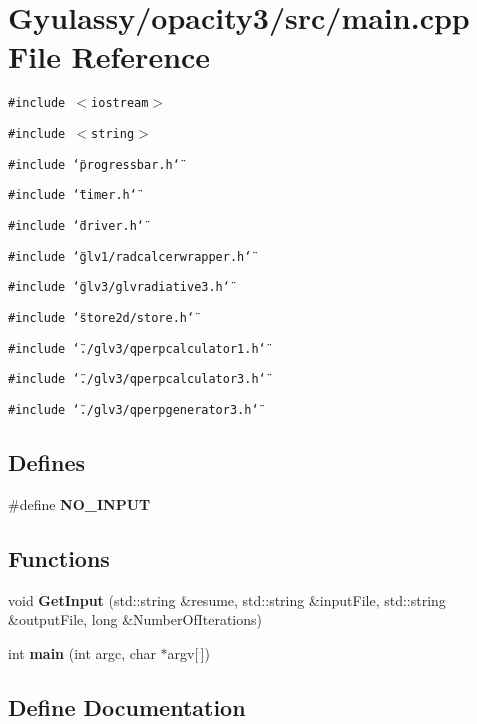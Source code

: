 \section{Gyulassy/opacity3/src/main.cpp File Reference}
\label{main_8cpp}
{\tt \#include $<$iostream$>$}\par
{\tt \#include $<$string$>$}\par
{\tt \#include \char`\"{}progressbar.h\char`\"{}}\par
{\tt \#include \char`\"{}timer.h\char`\"{}}\par
{\tt \#include \char`\"{}driver.h\char`\"{}}\par
{\tt \#include \char`\"{}glv1/radcalcerwrapper.h\char`\"{}}\par
{\tt \#include \char`\"{}glv3/glvradiative3.h\char`\"{}}\par
{\tt \#include \char`\"{}store2d/store.h\char`\"{}}\par
{\tt \#include \char`\"{}./glv3/qperpcalculator1.h\char`\"{}}\par
{\tt \#include \char`\"{}./glv3/qperpcalculator3.h\char`\"{}}\par
{\tt \#include \char`\"{}./glv3/qperpgenerator3.h\char`\"{}}\par
\subsection*{Defines}
\begin{CompactItemize}
\item 
\#define {\bf NO\_\-INPUT}
\end{CompactItemize}
\subsection*{Functions}
\begin{CompactItemize}
\item 
void {\bf GetInput} (std::string \&resume, std::string \&inputFile, std::string \&outputFile, long \&NumberOfIterations)
\item 
int {\bf main} (int argc, char $\ast$argv[$\,$])
\end{CompactItemize}


\subsection{Define Documentation}
